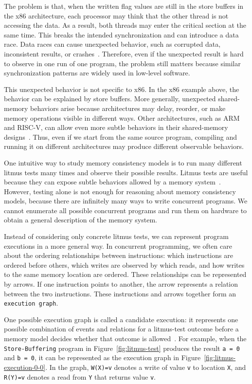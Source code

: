 The problem is that, when the written flag values are still in the store buffers in the x86 architecture, each processor may think that the other thread is not accessing the data. As a result, both threads may enter the critical section at the same time. This breaks the intended synchronization and can introduce a data race. Data races can cause unexpected behavior, such as corrupted data, inconsistent results, or crashes~\cite{batty2011mathematizing,alglave2018frightening}. Therefore, even if the unexpected result is hard to observe in one run of one program, the problem still matters because similar synchronization patterns are widely used in low-level software.

This unexpected behavior is not specific to x86. In the x86 example above, the behavior can
be explained by store buffers. More generally, unexpected shared-memory behaviors arise
because architectures may delay, reorder, or make memory operations visible in different
ways. Other architectures, such as ARM and RISC-V, can allow even more subtle behaviors
in their shared-memory designs~\cite{10.1145/3458926ArmedCat,riscv-spec,DennisPhdThesis}.
Thus, even if we start from the same source program, compiling and running it on different
architectures may produce different observable behaviors.

One intuitive way to study memory consistency models is to run many different litmus tests many times and observe their possible results. Litmus tests are useful because they can expose subtle behaviors allowed by a memory system~\cite{10.1145/2627752}. However, testing alone is not enough for reasoning about memory consistency models, because there are infinitely many ways to write concurrent programs. We cannot enumerate all possible concurrent programs and run them on hardware to obtain a general description of the memory system.

Instead of considering only concrete litmus tests, we can represent program executions in a more general way. In concurrent programming, we often care about the ordering relationships between instructions: which instructions are ordered before others, which writes are observed by which reads, and how writes to the same memory location are ordered. These relationships can be represented by arrows. If one instruction points to another, the arrow represents a relation between the two instructions. These instructions and arrows together form an \texttt{execution graph}.

One possible execution graph is called a candidate execution: it represents one possible combination of events and relations for a litmus-test outcome before a memory model decides whether that outcome is allowed~\cite{catManualSyntax11,10.1145/2627752}. For example, when the \texttt{Store-Buffering} program in Figure~\ref{fig:litmus-test} produces the result \texttt{a = 0} and \texttt{b = 0}, it can be represented as the execution graph in Figure~\ref{fig:litmus-execution-0-0}. In the graph, \texttt{W(X)=v} denotes a write of value \texttt{v} to location \texttt{X}, and \texttt{R(Y)=v} denotes a read from \texttt{Y} that returns value \texttt{v}.

